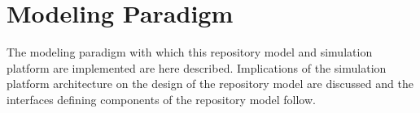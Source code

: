 \chapter{Modeling Paradigm}\label{ch:paradigm}

The modeling paradigm with which this repository model and simulation 
platform are implemented are here described. Implications of the 
simulation platform architecture on the design of the repository model 
are discussed and the interfaces defining components of the repository 
model follow. 






% 


